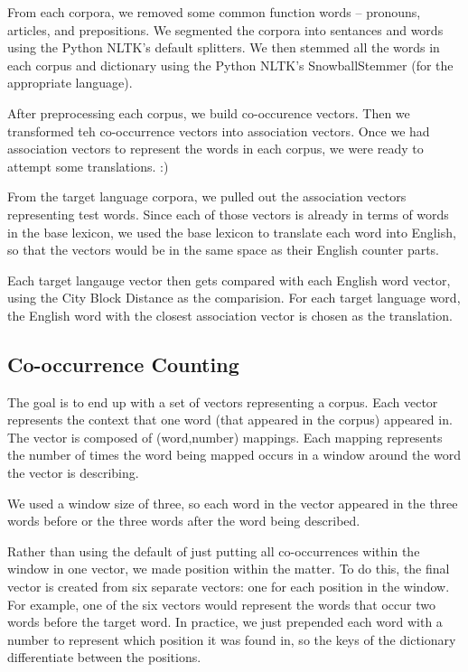 \documentclass[12pt]{article}
\begin{document}
From each corpora, we removed some common function words -- pronouns, articles,
and prepositions. We segmented the corpora into sentances and words using the
Python NLTK's default splitters. We then stemmed all the words in each corpus
and dictionary using the Python NLTK's SnowballStemmer (for the appropriate
language).

After preprocessing each corpus, we build co-occurence vectors. Then we
transformed teh co-occurrence vectors into association vectors. Once we had
association vectors to represent the words in each corpus, we were ready to
attempt some translations. :)


From the target language corpora, we pulled out the association vectors
representing test words. Since each of those vectors is already in terms of
words in the base lexicon, we used the base lexicon to translate each word into
English, so that the vectors would be in the same space as their English counter
parts.

Each target langauge vector then gets compared with each English word vector,
using the City Block Distance as the comparision. For each target language word,
the English word with the closest association vector is chosen as the
translation.

\subsection{Co-occurrence Counting}

The goal is to end up with a set of vectors representing a corpus. Each vector
represents the context that one word (that appeared in the corpus) appeared in.
The vector is composed of (word,number) mappings. Each mapping represents the
number of times the word being mapped occurs in a window around the word the
vector is describing.

We used a window size of three, so each word in the
vector appeared in the three words before or the three words after the word
being described.

Rather than using the default of just putting all co-occurrences within the
window in one vector, we made position within the matter. To do this, the
final vector is created from six separate vectors: one for each position in
the window. For example, one of the six vectors would represent the words that
occur two words before the target word. In practice, we just prepended each
word with a number to represent which position it was found in, so the keys of
the dictionary differentiate between the positions.
\end{document}
